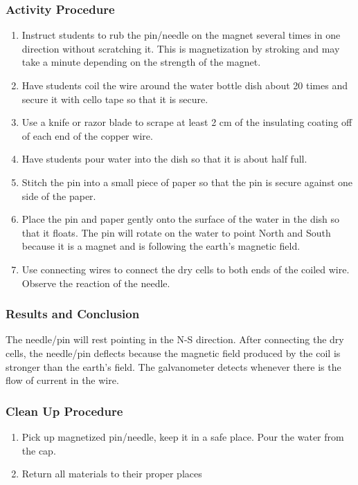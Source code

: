 \subsubsection*{Activity Procedure}
\begin{enumerate}
\item{Instruct students to rub the pin/needle on the magnet several times in one direction without scratching it. This is magnetization by stroking and may take a minute depending on the strength of the magnet.} 
\item{Have students coil the wire around the water bottle dish about 20 times and secure it with cello tape so that it is secure.} 
\item{Use a knife or razor blade to scrape at least 2 cm of the insulating coating off of each end of the copper wire.} 
\item{Have students pour water into the dish so that it is about half full.} 
\item{Stitch the pin into a small piece of paper so that the pin is secure against one side of the paper.} 
\item{Place the pin and paper gently onto the surface of the water in the dish so that it floats. The pin will rotate on the water to point North and South because it is a magnet and is following the earth's magnetic field.} 
\item{Use connecting wires to connect the dry cells to both ends of the coiled wire. Observe the reaction of the needle.} 
\end{enumerate}

\subsubsection*{Results and Conclusion}
The needle/pin will rest pointing in the N-S direction. After connecting the dry cells, the needle/pin deflects because the magnetic field produced by the coil is stronger than the earth's field. The galvanometer detects whenever there is the flow of current in the wire.  

\subsubsection*{Clean Up Procedure}
\begin{enumerate}
\item{Pick up magnetized pin/needle, keep it in a safe place. Pour the water from the cap.} 
\item{Return all materials to their proper places}
\end{enumerate}

